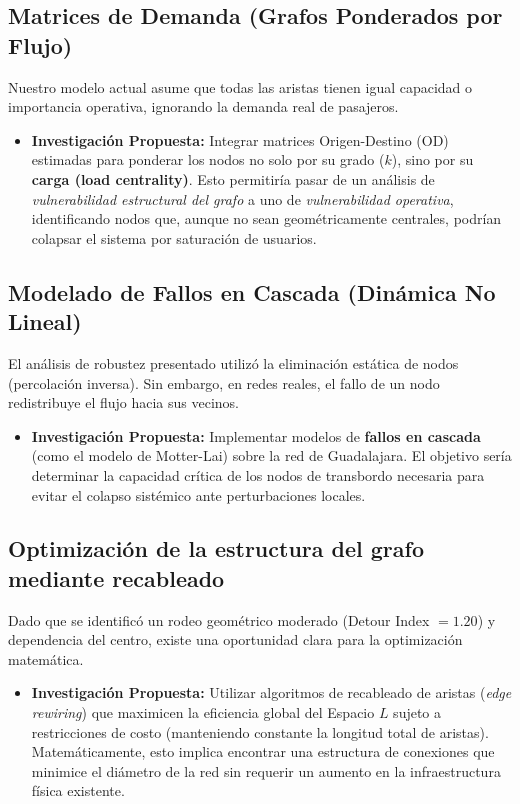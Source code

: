 \subsection{Matrices de Demanda (Grafos Ponderados por Flujo)}
Nuestro modelo actual asume que todas las aristas tienen igual capacidad o importancia operativa, ignorando la demanda real de pasajeros.
\begin{itemize}
    \item \textbf{Investigación Propuesta:} Integrar matrices Origen-Destino (OD) estimadas para ponderar los nodos no solo por su grado ($k$), sino por su \textbf{carga (load centrality)}. Esto permitiría pasar de un análisis de \textit{vulnerabilidad estructural del grafo} a uno de \textit{vulnerabilidad operativa}, identificando nodos que, aunque no sean geométricamente centrales, podrían colapsar el sistema por saturación de usuarios.
\end{itemize}

\subsection{Modelado de Fallos en Cascada (Dinámica No Lineal)}
El análisis de robustez presentado utilizó la eliminación estática de nodos (percolación inversa). Sin embargo, en redes reales, el fallo de un nodo redistribuye el flujo hacia sus vecinos.
\begin{itemize}
    \item \textbf{Investigación Propuesta:} Implementar modelos de \textbf{fallos en cascada} (como el modelo de Motter-Lai) sobre la red de Guadalajara. El objetivo sería determinar la capacidad crítica de los nodos de transbordo necesaria para evitar el colapso sistémico ante perturbaciones locales.
\end{itemize}

\subsection{Optimización de la estructura del grafo mediante recableado}
Dado que se identificó un rodeo geométrico moderado (Detour Index \(=1.20\)) y dependencia del centro, existe una oportunidad clara para la optimización matemática.
\begin{itemize}
    \item \textbf{Investigación Propuesta:} Utilizar algoritmos de recableado de aristas (\textit{edge rewiring}) que maximicen la eficiencia global del Espacio $L$ sujeto a restricciones de costo (manteniendo constante la longitud total de aristas). Matemáticamente, esto implica encontrar una estructura de conexiones que minimice el diámetro de la red sin requerir un aumento en la infraestructura física existente.
\end{itemize}

